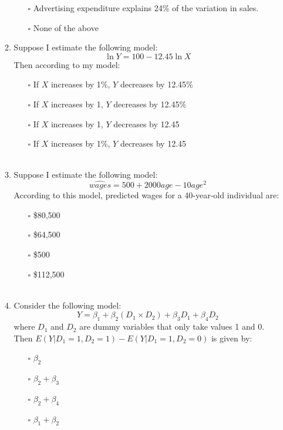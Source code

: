 \documentclass{./../../Latex/tests}
\begin{document}
\begin{enumerate}
\begin{enumerate}
\begin{enumerate}
	\item[$\square$] Advertising expenditure explains 24\% of the variation in sales. 
	\item[$\square$] None of the above \\
\end{enumerate}
\newpage 
\item Suppose I estimate the following model:
$$ \ln Y = 100 -12.45 \ln X  $$
Then according to my model:
\begin{enumerate}
	\item[$\square$] If $X$ increases by 1\%, $Y$ decreases by 12.45\% 
	\item[$\square$] If $X$ increases by 1, $Y$ decreases by 12.45\% 
	\item[$\square$] If $X$ increases by 1, $Y$ decreases by 12.45
	\item[$\square$] If $X$ increases by 1\%, $Y$ decreases by 12.45 \\~\\
\end{enumerate} 

\item Suppose I estimate the following model:
$$ \hat{wages} = 500 + 2000 age -10 age^2 $$
According to this model, predicted wages for a 40-year-old individual are:
\begin{enumerate}
	\item[$\square$]  \$80,500
	\item[$\square$] \$64,500
	\item[$\square$] \$500
	\item[$\square$] \$112,500 \\~\\
\end{enumerate}

\item Consider the following model:
$$ Y = \beta_1 + \beta_2 (D_1 \times D_2) + \beta_3 D_1 + \beta_4 D_2 $$
where $D_1$ and $D_2$ are dummy variables that only take values 1 and 0. Then $E(Y|D_1=1,D_2=1)-E(Y|D_1=1,D_2=0)$ is given by: \\
\begin{enumerate}
	\item[$\square$]  $\beta_2$
	\item[$\square$] $\beta_2 + \beta_3$
	\item[$\square$] $\beta_2+\beta_4$
	\item[$\square$] $\beta_1+\beta_2$
\end{enumerate}
\end{enumerate}


\end{enumerate}
\end{document}
